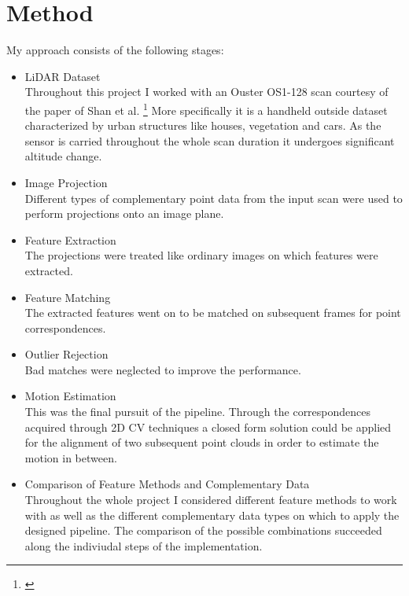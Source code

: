 \chapter{Method}\label{sec:method}

My approach consists of the following stages:

\begin{itemize}
    \item LiDAR Dataset\\
    Throughout this project I worked with an Ouster OS1-128 scan courtesy of the paper of Shan et al. \footnote{\citep*{robust2021shan}}
    More specifically it is a handheld outside dataset characterized by urban structures like houses, vegetation and cars. As the sensor is carried throughout the whole scan duration it undergoes significant altitude change.
    \item Image Projection\\
    Different types of complementary point data from the input scan were used to perform projections onto an image plane.
    \item Feature Extraction\\
    The projections were treated like ordinary images on which features were extracted. 
    \item Feature Matching\\
    The extracted features went on to be matched on subsequent frames for point correspondences.
    \item Outlier Rejection\\
    Bad matches were neglected to improve the performance.
    \item Motion Estimation\\
    This was the final pursuit of the pipeline. Through the correspondences acquired through 2D CV techniques a closed form solution could be applied for the alignment of two subsequent point clouds in order to estimate the motion in between.
    \item Comparison of Feature Methods and Complementary Data\\
    Throughout the whole project I considered different feature methods to work with as well as the different complementary data types on which to apply the designed pipeline. The comparison of the possible combinations succeeded along the indiviudal steps of the implementation.
\end{itemize}



